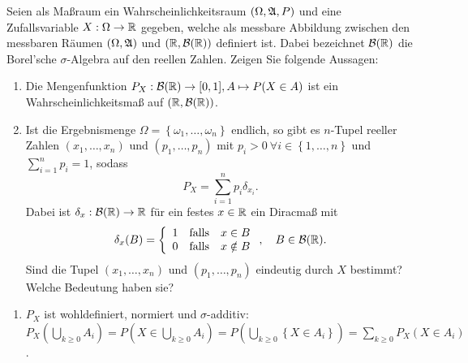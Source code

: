 Seien als Ma{\ss}raum ein Wahrscheinlichkeitsraum $\left( \Omega, \mathfrak A, P \right)$ und eine
Zufallsvariable $X: \Omega \to \mathbb R$ gegeben, welche als messbare Abbildung zwischen den messbaren R\"aumen $\left( \Omega,\mathfrak A\right)$ und  $\left( \mathbb R,\mathcal B(\mathbb R) \right)$ definiert ist.
Dabei bezeichnet $\mathcal B(\mathbb R)$ die Borel'sche $\sigma$-Algebra auf den reellen Zahlen. Zeigen Sie folgende Aussagen:
\begin{enumerate}
    \item Die Mengenfunktion $P_{X}: \mathcal B(\mathbb R) \to [0,1], A \mapsto P( X \in A
        )$ ist ein Wahrscheinlichkeitsmaß auf $(\mathbb R, \mathcal B(\mathbb R))$. 

    \item Ist die Ergebnismenge $\Omega = \left\{ \omega_{1},\dots ,\omega_{n} \right\}$ endlich,
        so gibt es $n$-Tupel reeller Zahlen $(x_1,\dots ,x_n)$ und $(p_1,\dots ,p_n)$ mit 
        $p_i>0 \ \forall i\in \left\{ 1,\dots ,n \right\}$ und $\sum_{i=1}^{n} p_i = 1$, sodass 
        \begin{equation*}
            P_X = \sum_{i=1}^{n} p_i \delta_{x_i}.
        \end{equation*}
        Dabei ist $\delta_x : \mathcal B(\mathbb R) \to \mathbb{R}$ für ein festes $x\in\mathbb R$ ein
        Diracmaß mit $$\delta_x(B)=\left\{\begin{array}{lll} 1 & \mbox{falls} & x \in B\\ 0 & \mbox{falls} & x \notin B \end{array}\right., \quad B \in \mathcal B(\mathbb R).$$
        Sind die Tupel
        $(x_1,\dots ,x_n)$ und $(p_1,\dots ,p_n)$ eindeutig durch $X$ bestimmt?
        Welche Bedeutung haben sie?
\end{enumerate}

\solution
\begin{enumerate}
    \item $P_X$ ist wohldefiniert, normiert und $\sigma$-additiv: $P_X \left( \bigcup_{k\geq 0} A_i \right) = P\left( X \in \bigcup_{k\geq 0} A_i \right)= P\left( \bigcup_{k\geq 0} \left\{ X\in A_i \right\} \right) = \sum_{k\geq 0}^{} P_X\left( X \in A_i \right)$.
\end{enumerate}

